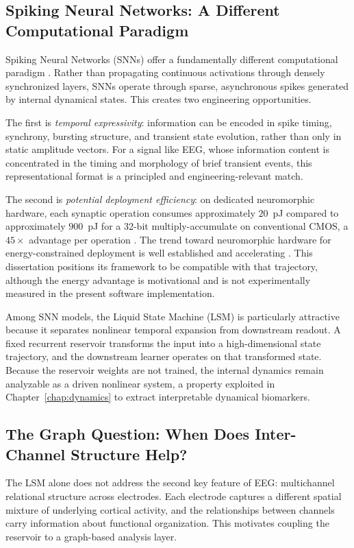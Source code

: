 \subsection{Spiking Neural Networks: A Different Computational Paradigm}

Spiking Neural Networks (SNNs) offer a fundamentally different computational paradigm \cite{maass_networks_1997}. Rather than propagating continuous activations through densely synchronized layers, SNNs operate through sparse, asynchronous spikes generated by internal dynamical states. This creates two engineering opportunities.

The first is \emph{temporal expressivity}: information can be encoded in spike timing, synchrony, bursting structure, and transient state evolution, rather than only in static amplitude vectors. For a signal like EEG, whose information content is concentrated in the timing and morphology of brief transient events, this representational format is a principled and engineering-relevant match.

The second is \emph{potential deployment efficiency}: on dedicated neuromorphic hardware, each synaptic operation consumes approximately $20$~pJ compared to approximately $900$~pJ for a 32-bit multiply-accumulate on conventional CMOS, a $45\times$ advantage per operation \cite{davies2018loihi}. The trend toward neuromorphic hardware for energy-constrained deployment is well established and accelerating \cite{schuman2022neuromorphic}. This dissertation positions its framework to be compatible with that trajectory, although the energy advantage is motivational and is not experimentally measured in the present software implementation.

Among SNN models, the Liquid State Machine (LSM) is particularly attractive because it separates nonlinear temporal expansion from downstream readout. A fixed recurrent reservoir transforms the input into a high-dimensional state trajectory, and the downstream learner operates on that transformed state. Because the reservoir weights are not trained, the internal dynamics remain analyzable as a driven nonlinear system, a property exploited in Chapter~\ref{chap:dynamics} to extract interpretable dynamical biomarkers.

\subsection{The Graph Question: When Does Inter-Channel Structure Help?}

The LSM alone does not address the second key feature of EEG: multichannel relational structure across electrodes. Each electrode captures a different spatial mixture of underlying cortical activity, and the relationships between channels carry information about functional organization. This motivates coupling the reservoir to a graph-based analysis layer.

